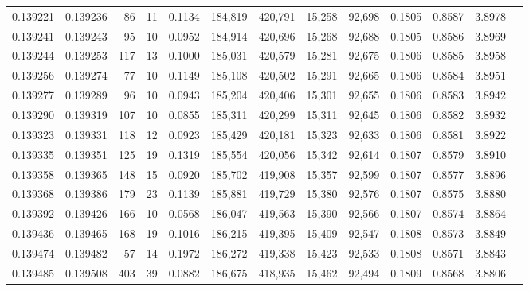 \begin{tabular}{rrrrrrrrrrrrr}
0.139221 & 0.139236 &    86 &  11 &                                     0.1134 & 184,819 & 420,791 &  15,258 &  92,698 & 0.1805 & 0.8587 & 3.8978 \\
0.139241 & 0.139243 &    95 &  10 &                                     0.0952 & 184,914 & 420,696 &  15,268 &  92,688 & 0.1805 & 0.8586 & 3.8969 \\
0.139244 & 0.139253 &   117 &  13 &                                     0.1000 & 185,031 & 420,579 &  15,281 &  92,675 & 0.1806 & 0.8585 & 3.8958 \\
0.139256 & 0.139274 &    77 &  10 &                                     0.1149 & 185,108 & 420,502 &  15,291 &  92,665 & 0.1806 & 0.8584 & 3.8951 \\
0.139277 & 0.139289 &    96 &  10 &                                     0.0943 & 185,204 & 420,406 &  15,301 &  92,655 & 0.1806 & 0.8583 & 3.8942 \\
0.139290 & 0.139319 &   107 &  10 &                                     0.0855 & 185,311 & 420,299 &  15,311 &  92,645 & 0.1806 & 0.8582 & 3.8932 \\
0.139323 & 0.139331 &   118 &  12 &                                     0.0923 & 185,429 & 420,181 &  15,323 &  92,633 & 0.1806 & 0.8581 & 3.8922 \\
0.139335 & 0.139351 &   125 &  19 &                                     0.1319 & 185,554 & 420,056 &  15,342 &  92,614 & 0.1807 & 0.8579 & 3.8910 \\
0.139358 & 0.139365 &   148 &  15 &                                     0.0920 & 185,702 & 419,908 &  15,357 &  92,599 & 0.1807 & 0.8577 & 3.8896 \\
0.139368 & 0.139386 &   179 &  23 &                                     0.1139 & 185,881 & 419,729 &  15,380 &  92,576 & 0.1807 & 0.8575 & 3.8880 \\
0.139392 & 0.139426 &   166 &  10 &                                     0.0568 & 186,047 & 419,563 &  15,390 &  92,566 & 0.1807 & 0.8574 & 3.8864 \\
0.139436 & 0.139465 &   168 &  19 &                                     0.1016 & 186,215 & 419,395 &  15,409 &  92,547 & 0.1808 & 0.8573 & 3.8849 \\
0.139474 & 0.139482 &    57 &  14 &                                     0.1972 & 186,272 & 419,338 &  15,423 &  92,533 & 0.1808 & 0.8571 & 3.8843 \\
0.139485 & 0.139508 &   403 &  39 &                                     0.0882 & 186,675 & 418,935 &  15,462 &  92,494 & 0.1809 & 0.8568 & 3.8806 \\

\end{tabular}
